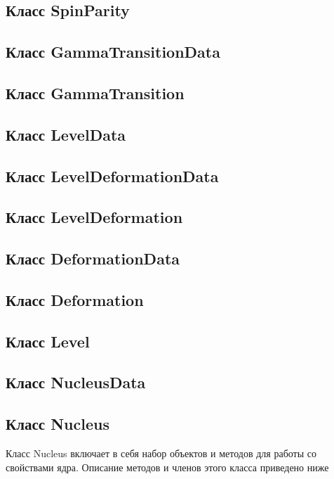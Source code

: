 \documentclass[a4paper,12pt]{extarticle}
\begin{document}
\subsection{Класс SpinParity}

\subsection{Класс GammaTransitionData}

\subsection{Класс GammaTransition}

\subsection{Класс LevelData}

\subsection{Класс LevelDeformationData}

\subsection{Класс LevelDeformation}

\subsection{Класс DeformationData}

\subsection{Класс Deformation}

\subsection{Класс Level}

\subsection{Класс NucleusData}

\subsection{Класс Nucleus}
Класс Nucleus включает в себя набор объектов и методов для работы со свойствами ядра. Описание методов и членов этого класса приведено ниже
\end{document}

